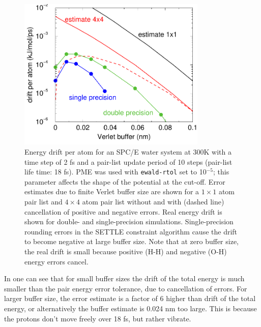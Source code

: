 {\begin{figure}
\centerline{\includegraphics[width=9cm]{plots/verlet-drift}}
\caption {Energy drift per atom for an SPC/E water system at 300K with
  a time step of 2 fs and a pair-list update period of 10 steps
  (pair-list life time: 18 fs). PME was used with {\tt ewald-rtol} set
  to 10$^{-5}$; this parameter affects the shape of the potential at
  the cut-off. Error estimates due to finite Verlet buffer size are
  shown for a $1 \times 1$ atom pair list and $4 \times 4$ atom pair
  list without and with (dashed line) cancellation of positive and
  negative errors. Real energy drift is shown for double- and
  single-precision simulations. Single-precision rounding errors in
  the SETTLE constraint algorithm cause the drift to become negative
  at large buffer size. Note that at zero buffer size, the real drift
  is small because positive (H-H) and negative (O-H) energy errors
  cancel.}
\label{fig:verletdrift}
\end{figure}

In  one can see that for small buffer sizes the drift
of the total energy is much smaller than the pair energy error tolerance,
due to cancellation of errors. For larger buffer size, the error estimate
is a factor of 6 higher than drift of the total energy, or alternatively
the buffer estimate is 0.024 nm too large. This is because the protons
don't move freely over 18 fs, but rather vibrate.

}
